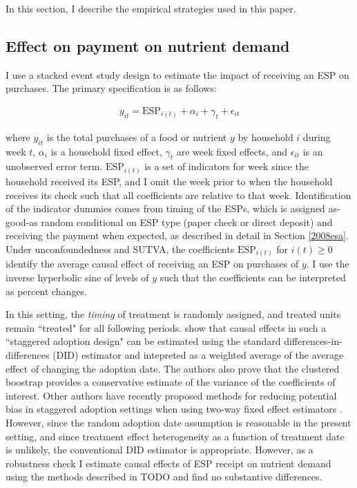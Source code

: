 \documentclass[12pt]{article}
\begin{document}
In this section, I describe the empirical strategies used in this paper.

\subsection{Effect on payment on nutrient demand}

I use a stacked event study design to estimate the impact of receiving an ESP on purchases. The primary specification is as follows:

\begin{align}
	y_{it} = \text{ESP}_{i(t)} + \alpha_i + \gamma_t + \epsilon_{it} \label{spec_es}
\end{align}

where $y_{it}$ is the total purchases of a food or nutrient $y$ by household $i$ during week $t$, $\alpha_i$ is a household fixed effect, $\gamma_t$ are week fixed effects, and $\epsilon_{it}$ is an unobserved error term. $\text{ESP}_{i(t)}$ is a set of indicators for week since the household received its ESP, and I omit the week prior to when the household receives its check such that all coefficients are relative to that week. Identification of the indicator dummies comes from timing of the ESPs, which is assigned as-good-as random conditional on ESP type (paper check or direct deposit) and receiving the payment when expected, as described in detail in Section \ref{2008esa}. Under unconfoundedness and SUTVA, the coefficients $\text{ESP}_{i(t)}$ for $i(t) \geq 0$ identify the average causal effect of receiving an ESP on purchases of $y$. I use the inverse hyperbolic sine of levels of $y$ such that the coefficients can be interpreted as percent changes.

In this setting, the \textit{timing} of treatment is randomly assigned, and treated units remain ``treated" for all following periods. \textcite{athey2021design} show that causal effects in such a ``staggered adoption design" can be estimated using the standard differences-in-differences (DID) estimator and intepreted as a weighted average of the average effect of changing the adoption date. The authors also prove that the clustered boostrap provides a conservative estimate of the variance of the coefficients of interest. Other authors have recently proposed methods for reducing potential bias in staggered adoption settings when using two-way fixed effect estimators \parencite{callaway2020difference, goodman2018difference, de2020two, sun2020estimating}. However, since the random adoption date assumption is reasonable in the present setting, and since treatment effect heterogeneity as a function of treatment date is unlikely, the conventional DID estimator is appropriate. However, as a robustness check I estimate causal effects of ESP receipt on nutrient demand using the methods described in TODO and find no substantive differences.
\end{document}
